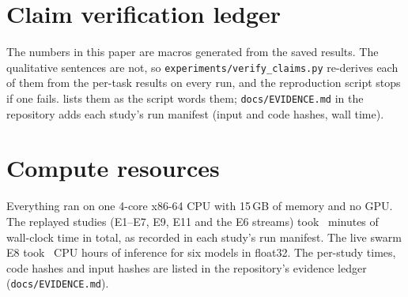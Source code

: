 \section{Claim verification ledger}\label{app:claims}
The numbers in this paper are macros generated from the saved results. The qualitative sentences are not, so \texttt{experiments/\allowbreak verify\_claims.py} re-derives each of them from the per-task results on every run, and the reproduction script stops if one fails.  lists them as the script words them; \texttt{docs/EVIDENCE.md} in the repository adds each study's run manifest (input and code hashes, wall time).
{\small

}

\section{Compute resources}\label{app:compute}
Everything ran on one 4-core x86-64 CPU with 15\,GB of memory and no GPU. The replayed studies (E1--E7, E9, E11 and the E6 streams) took \computeReplayMinutes\ minutes of wall-clock time in total, as recorded in each study's run manifest. The live swarm E8 took \computeLiveHours\ CPU hours of inference for six models in float32. The per-study times, code hashes and input hashes are listed in the repository's evidence ledger (\texttt{docs/EVIDENCE.md}).

